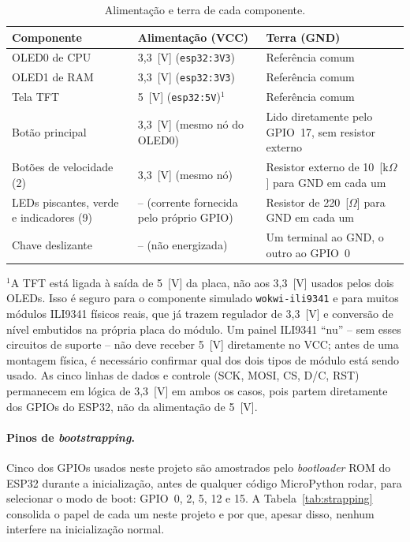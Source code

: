 \documentclass[12pt,a4paper]{article}
\begin{document}
\begin{table}[htbp]
  \centering
  \caption{Alimentação e terra de cada componente.}
  \label{tab:alimentacao}
  \begin{tabularx}{\textwidth}{@{}Y C{3.2cm} Y@{}}
    \toprule
    Componente & Alimentação (VCC) & Terra (GND) \\
    \midrule
    OLED0 de CPU & 3,3~[V] (\texttt{esp32:3V3}) & Referência comum \\
    OLED1 de RAM & 3,3~[V] (\texttt{esp32:3V3}) & Referência comum \\
    Tela TFT & 5~[V] (\texttt{esp32:5V})$^{1}$ & Referência comum \\
    Botão principal & 3,3~[V] (mesmo nó do OLED0) & Lido diretamente pelo GPIO~17, sem resistor externo \\
    Botões de velocidade (2) & 3,3~[V] (mesmo nó) & Resistor externo de 10~[k$\Omega$] para GND em cada um \\
    LEDs piscantes, verde e indicadores (9) & -- (corrente fornecida pelo próprio GPIO) & Resistor de 220~[$\Omega$] para GND em cada um \\
    Chave deslizante & -- (não energizada) & Um terminal ao GND, o outro ao GPIO~0 \\
    \bottomrule
  \end{tabularx}

  \vspace{0.3em}
  {\justifying\footnotesize
  $^{1}$A TFT está ligada à saída de 5~[V] da placa, não aos 3,3~[V] usados pelos dois OLEDs. Isso é seguro para o componente simulado \texttt{wokwi-ili9341} e para muitos módulos ILI9341 físicos reais, que já trazem regulador de 3,3~[V] e conversão de nível embutidos na própria placa do módulo. Um painel ILI9341 ``nu'' -- sem esses circuitos de suporte -- não deve receber 5~[V] diretamente no VCC; antes de uma montagem física, é necessário confirmar qual dos dois tipos de módulo está sendo usado. As cinco linhas de dados e controle (SCK, MOSI, CS, D/C, RST) permanecem em lógica de 3,3~[V] em ambos os casos, pois partem diretamente dos GPIOs do ESP32, não da alimentação de 5~[V].\par}
\end{table}

\paragraph{Pinos de \textit{bootstrapping}.} Cinco dos GPIOs usados neste projeto são amostrados pelo \textit{bootloader} ROM do ESP32 durante a inicialização, antes de qualquer código MicroPython rodar, para selecionar o modo de boot: GPIO~0, 2, 5, 12 e 15. A Tabela~\ref{tab:strapping} consolida o papel de cada um neste projeto e por que, apesar disso, nenhum interfere na inicialização normal.
\end{document}
